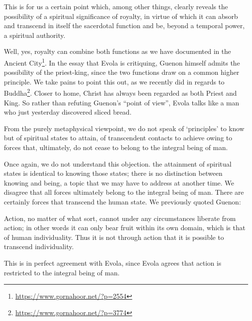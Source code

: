 \begin{quotex}
This is for us a certain point which, among other things, clearly reveals the possibility of a spiritual significance of royalty, in virtue of which it can absorb and transcend in itself the sacerdotal function and be, beyond a temporal power, a spiritual authority.
\end{quotex}

Well, yes, royalty can combine both functions as we have documented in the Ancient City\footnote{\url{https://www.gornahoor.net/?p=2554}}. In the essay that Evola is critiquing, Guenon himself admits the possibility of the priest-king, since the two functions draw on a common higher principle. We take pains to point this out, as we recently did in regards to Buddha\footnote{\url{https://www.gornahoor.net/?p=3774}}. Closer to home, Christ has always been regarded as both Priest and King. So rather than refuting Guenon's ``point of view'', Evola talks like a man who just yesterday discovered sliced bread.

\begin{quotex}
From the purely metaphysical viewpoint, we do not speak of `principles' to know but of spiritual states to attain, of transcendent contacts to achieve owing to forces that, ultimately, do not cease to belong to the integral being of man.
\end{quotex}


Once again, we do not understand this objection. the attainment of spiritual states is identical to knowing those states; there is no distinction between knowing and being, a topic that we may have to address at another time. We disagree that all forces ultimately belong to the integral being of man. There are certainly forces that transcend the human state. We previously quoted Guenon:

\begin{quotex}
Action, no matter of what sort, cannot under any circumstances liberate from action; in other words it can only bear fruit within its own domain, which is that of human individuality. Thus it is not through action that it is possible to transcend individuality.
\end{quotex}


This is in perfect agreement with Evola, since Evola agrees that action is restricted to the integral being of man.


